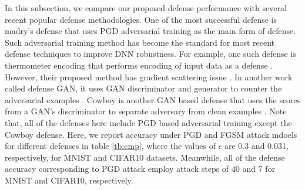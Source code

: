 \documentclass{article}
\begin{document}
In this subsection, we compare our proposed defense performance with several recent popular defense methodologies. One of the most successful defense is madry's defense \cite{madry2017towards} that uses PGD adversarial training as the main form of defense. Such adversarial training method has become the standard for most recent defense techniques to improve DNN robustness. For example, one such defense is thermometer encoding that performs encoding of input data as a defense \cite{buckman2018thermometer}. However, their proposed method has gradient scattering issue \cite{athalye2018obfuscated}. In another work called defense GAN, it uses GAN discriminator and generator to counter the adversarial examples \cite{samangouei2018defense}. Cowboy is another GAN based defense that uses the scores from a GAN's discriminator to separate adversary from clean examples \cite{santhanam2018defending}. Note that, all of the defenses here include PGD based adversarial training except the Cowboy defense. Here, we report accuracy under PGD and FGSM attack mdoels for different defenses in table \ref{tb:cmp}, where the values of $\epsilon$ are 0.3 and 0.031, respectively, for MNIST and CIFAR10 datasets. Meanwhile, all of the defense accuracy corresponding to PGD attack employ attack steps of 40 and 7 for MNIST and CIFAR10, respectively.
\end{document}
